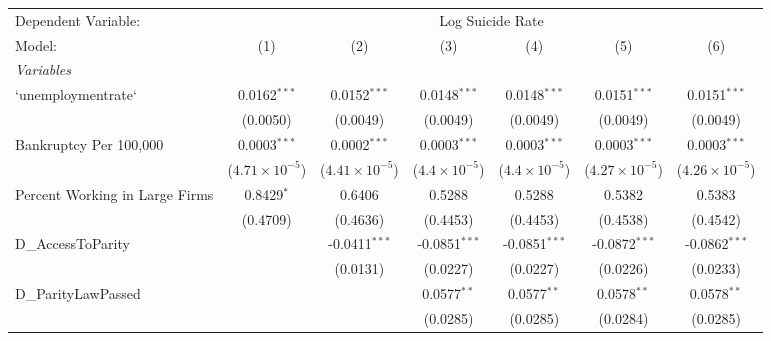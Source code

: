 \begingroup
\centering
\begin{tabular}{lcccccc}
   \tabularnewline \midrule \midrule
   Dependent Variable: & \multicolumn{6}{c}{Log Suicide Rate}\\
   Model:                         & (1)                     & (2)                     & (3)                    & (4)                    & (5)                     & (6)\\  
   \midrule
   \emph{Variables}\\
   `unemploymentrate`             & 0.0162$^{***}$          & 0.0152$^{***}$          & 0.0148$^{***}$         & 0.0148$^{***}$         & 0.0151$^{***}$          & 0.0151$^{***}$\\   
                                  & (0.0050)                & (0.0049)                & (0.0049)               & (0.0049)               & (0.0049)                & (0.0049)\\   
   Bankruptcy Per 100,000         & 0.0003$^{***}$          & 0.0002$^{***}$          & 0.0003$^{***}$         & 0.0003$^{***}$         & 0.0003$^{***}$          & 0.0003$^{***}$\\   
                                  & ($4.71\times 10^{-5}$)  & ($4.41\times 10^{-5}$)  & ($4.4\times 10^{-5}$)  & ($4.4\times 10^{-5}$)  & ($4.27\times 10^{-5}$)  & ($4.26\times 10^{-5}$)\\    
   Percent Working in Large Firms & 0.8429$^{*}$            & 0.6406                  & 0.5288                 & 0.5288                 & 0.5382                  & 0.5383\\   
                                  & (0.4709)                & (0.4636)                & (0.4453)               & (0.4453)               & (0.4538)                & (0.4542)\\   
   D\_AccessToParity              &                         & -0.0411$^{***}$         & -0.0851$^{***}$        & -0.0851$^{***}$        & -0.0872$^{***}$         & -0.0862$^{***}$\\   
                                  &                         & (0.0131)                & (0.0227)               & (0.0227)               & (0.0226)                & (0.0233)\\   
   D\_ParityLawPassed             &                         &                         & 0.0577$^{**}$          & 0.0577$^{**}$          & 0.0578$^{**}$           & 0.0578$^{**}$\\   
                                  &                         &                         & (0.0285)               & (0.0285)               & (0.0284)                & (0.0285)\\   

\end{tabular}
